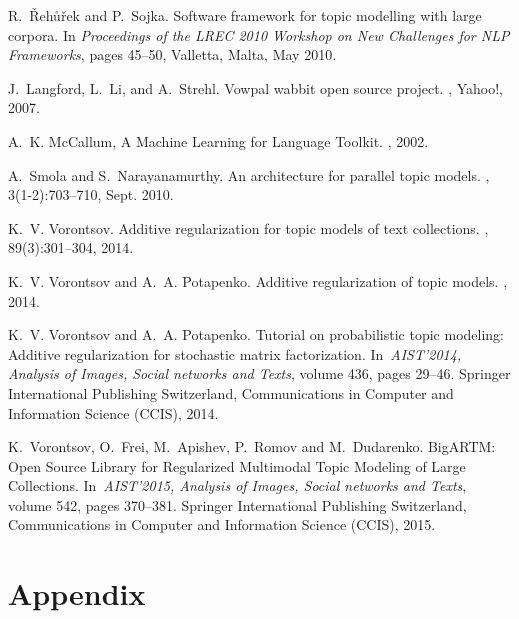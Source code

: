 \documentclass[russian,english]{llncs}
\begin{document}
\begin{thebibliography}{10}
R.~\v{R}eh\r{u}\v{r}ek and P.~Sojka.
\newblock Software framework for topic modelling with large corpora.
\newblock In {\em Proceedings of the {LREC} 2010 Workshop on New Challenges for
	{NLP} Frameworks}, pages 45--50, Valletta, Malta, May 2010.


J.~Langford, L.~Li, and A.~Strehl.
\newblock Vowpal wabbit open source project.
, Yahoo!, 2007.

A.~K. McCallum,
\newblock A Machine Learning for Language Toolkit.
, 2002.
   
A.~Smola and S.~Narayanamurthy.
\newblock An architecture for parallel topic models.
, 3(1-2):703--710, Sept. 2010.

K.~V. Vorontsov.
\newblock Additive regularization for topic models of text collections.
, 89(3):301--304, 2014.

K.~V. Vorontsov and A.~A. Potapenko.
\newblock Additive regularization of topic models.
, 2014.

K.~V. Vorontsov and A.~A. Potapenko.
\newblock Tutorial on probabilistic topic modeling: Additive regularization for stochastic matrix factorization.
\newblock In~{\em AIST'2014, Analysis of Images, Social networks and Texts},
volume 436, pages 29--46. Springer International Publishing Switzerland,
Communications in Computer and Information Science (CCIS), 2014.

K.~Vorontsov, O.~Frei, M.~Apishev, P.~Romov and M.~Dudarenko.
\newblock BigARTM: Open Source Library for Regularized Multimodal Topic Modeling of Large Collections.
\newblock In~{\em AIST'2015, Analysis of Images, Social networks and Texts},
volume 542, pages 370--381. Springer International Publishing Switzerland,
Communications in Computer and Information Science (CCIS), 2015.


\end{thebibliography}

\newpage
\section*{Appendix}
\label{sec:Appendix}
\end{document}
